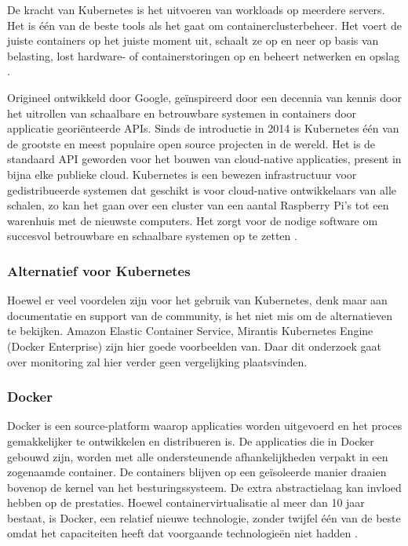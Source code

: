 De kracht van Kubernetes is het uitvoeren van workloads op meerdere servers. Het is één van de beste tools als het gaat om containerclusterbeheer. Het voert de juiste containers op het juiste moment uit, schaalt ze op en neer op basis van belasting, lost hardware- of containerstoringen op en beheert netwerken en opslag \autocite{Rancher2020}.

Origineel ontwikkeld door Google, geïnspireerd door een decennia van kennis door het uitrollen van schaalbare en betrouwbare systemen in containers door applicatie georiënteerde APIs. Sinds de introductie in 2014 is Kubernetes één van de grootste en meest populaire open source projecten in de wereld. Het is de standaard API geworden voor het bouwen van cloud-native applicaties, present in bijna elke publieke cloud. Kubernetes is een bewezen infrastructuur voor gedistribueerde systemen dat geschikt is voor cloud-native ontwikkelaars van alle schalen, zo kan het gaan over een cluster van een aantal Raspberry Pi's tot een warenhuis met de nieuwste computers. Het zorgt voor de nodige software om succesvol betrouwbare en schaalbare systemen op te zetten \autocite{Burns2019}.


\subsubsection{Alternatief voor Kubernetes}
Hoewel er veel voordelen zijn voor het gebruik van Kubernetes, denk maar aan documentatie en support van de community, is het niet mis om de alternatieven te bekijken. Amazon Elastic Container Service, Mirantis Kubernetes Engine (Docker Enterprise) zijn hier goede voorbeelden van. Daar dit onderzoek gaat over monitoring zal hier verder geen vergelijking plaatsvinden.

\subsubsection{Docker}
Docker is een source-platform waarop applicaties worden uitgevoerd en het proces gemakkelijker te ontwikkelen en distribueren is. De applicaties die in Docker gebouwd zijn, worden met alle ondersteunende afhankelijkheden verpakt in een zogenaamde container. De containers blijven op een geïsoleerde manier draaien bovenop de kernel van het besturingssysteem. De extra abstractielaag kan invloed hebben op de prestaties. Hoewel containervirtualisatie al meer dan 10 jaar bestaat, is Docker, een relatief nieuwe technologie, zonder twijfel één van de beste omdat het capaciteiten heeft dat voorgaande technologieën niet hadden \autocite{Rad2017}.

